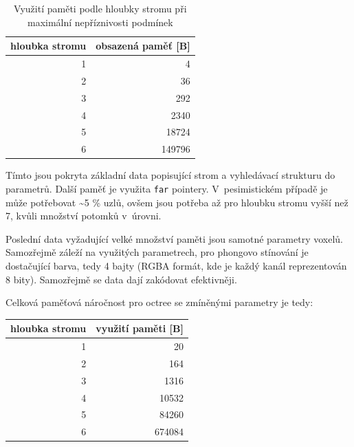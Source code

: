 \begin{table}[H]
	\centering
	\begin{tabular}{|r|r|}
		\hline
		\multicolumn{1}{|c|}{hloubka stromu} & \multicolumn{1}{c|}{obsazená paměť {[}B{]}} \\ \hline
		1                                    & 4                                           \\ \hline
		2                                    & 36                                          \\ \hline
		3                                    & 292                                         \\ \hline
		4                                    & 2340                                        \\ \hline
		5                                    & 18724                                       \\ \hline
		6                                    & 149796                                      \\ \hline
	\end{tabular}
	\caption{Využití paměti podle hloubky stromu při maximální nepříznivosti podmínek}
\end{table}

Tímto jsou pokryta základní data popisující strom a vyhledávací strukturu do parametrů. Další paměť je využita \texttt{far} pointery. V~pesimistickém případě je může potřebovat \textasciitilde5 \% uzlů, ovšem jsou potřeba až pro hloubku stromu vyšší než 7, kvůli množství potomků v~úrovni.

Poslední data vyžadující velké množství paměti jsou samotné parametry voxelů. Samozřejmě záleží na využitých parametrech, pro phongovo stínování je dostačující barva, tedy 4 bajty (RGBA formát, kde je každý kanál reprezentován 8 bity). Samozřejmě se data dají zakódovat efektivněji.

Celková paměťová náročnost pro octree se zmíněnými parametry je tedy:

\begin{table}[H]
	\centering
	\begin{tabular}{|r|r|}
		\hline
		\multicolumn{1}{|c|}{hloubka stromu} & \multicolumn{1}{c|}{využití paměti {[}B{]}} \\ \hline
		1                                    & 20                                          \\ \hline
		2                                    & 164                                         \\ \hline
		3                                    & 1316                                        \\ \hline
		4                                    & 10532                                       \\ \hline
		5                                    & 84260                                       \\ \hline
		6                                    & 674084                                      \\ \hline
	\end{tabular}
\end{table}

